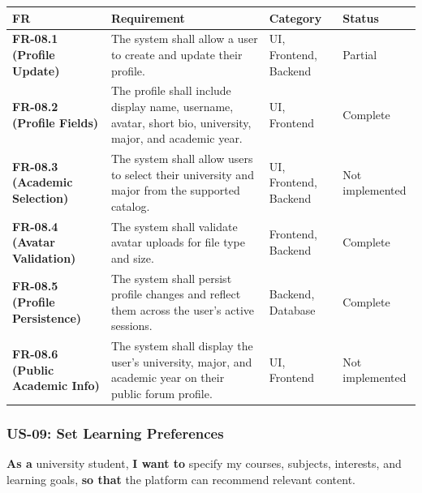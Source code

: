 \documentclass[12pt]{article}
\renewcommand{\baselinestretch}{1.5}
\begin{document}
\begingroup
\small
\renewcommand{\baselinestretch}{1.0}\selectfont
\renewcommand{\arraystretch}{1.15}
\setlength{\tabcolsep}{6pt}
\begin{longtable}{|>{\raggedright\arraybackslash}p{}|>{\raggedright\arraybackslash}p{}|>{\raggedright\arraybackslash}p{}|>{\raggedright\arraybackslash}p{}|}
\hline
\textbf{FR} & \textbf{Requirement} & \textbf{Category} & \textbf{Status} \\ \hline
\endhead
\textbf{FR-08.1 (Profile Update)} & The system shall allow a user to create and update their profile. & UI, Frontend, Backend & Partial \\ \hline
\textbf{FR-08.2 (Profile Fields)} & The profile shall include display name, username, avatar, short bio, university, major, and academic year. & UI, Frontend & Complete \\ \hline
\textbf{FR-08.3 (Academic Selection)} & The system shall allow users to select their university and major from the supported catalog. & UI, Frontend, Backend & Not implemented \\ \hline
\textbf{FR-08.4 (Avatar Validation)} & The system shall validate avatar uploads for file type and size. & Frontend, Backend & Complete \\ \hline
\textbf{FR-08.5 (Profile Persistence)} & The system shall persist profile changes and reflect them across the user's active sessions. & Backend, Database & Complete \\ \hline
\textbf{FR-08.6 (Public Academic Info)} & The system shall display the user's university, major, and academic year on their public forum profile. & UI, Frontend & Not implemented \\ \hline
\end{longtable}
\endgroup
\par\medskip

\hypertarget{sec:us-09-set-learning-preferences}{}
\subsubsection*{US-09: Set Learning Preferences}
\par\medskip

\textbf{As a} university student, \textbf{I want to} specify my courses, subjects, interests, and learning goals, \textbf{so that} the platform can recommend relevant content.
\par\medskip
\end{document}
